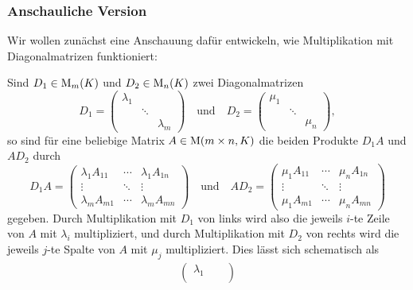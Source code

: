\subsubsection{Anschauliche Version}

Wir wollen zunächst eine Anschauung dafür entwickeln, wie Multiplikation mit Diagonalmatrizen funktioniert:

\begin{observation}
  \label{observation: multiplication with diagonal matrices}
  Sind $D_1 \in \operatorname{M}_{m}(K)$ und $D_2 \in \operatorname{M}_{n}(K)$ zwei Diagonalmatrizen
  \[
      D_1
    = \begin{pmatrix}
        \lambda_1 &         &           \\
                  & \ddots  &           \\
                  &         & \lambda_m 
      \end{pmatrix}
    \quad\text{und}\quad
      D_2
    = \begin{pmatrix}
        \mu_1 &         &       \\
              & \ddots  &       \\
              &         & \mu_n 
      \end{pmatrix},
  \]
  so sind für eine beliebige Matrix $A \in \operatorname{M}(m \times n, K)$ die beiden Produkte $D_1 A$ und $A D_2$ durch
  \[
      D_1 A
    = \begin{pmatrix}
        \lambda_1 A_{11}  & \cdots  & \lambda_1 A_{1n}  \\
        \vdots            & \ddots  & \vdots            \\
        \lambda_m A_{m1}  & \cdots  & \lambda_m A_{mn}
      \end{pmatrix}
    \quad\text{und}\quad
      A D_2
    = \begin{pmatrix}
        \mu_1 A_{11}  & \cdots  & \mu_n A_{1n}  \\
        \vdots        & \ddots  & \vdots        \\
        \mu_1 A_{m1}  & \cdots  & \mu_n A_{mn}
      \end{pmatrix}
  \]
  gegeben.
  Durch Multiplikation mit $D_1$ von links wird also die jeweils $i$-te Zeile von $A$ mit $\lambda_i$ multipliziert, und durch Multiplikation mit $D_2$ von rechts wird die jeweils $j$-te Spalte von $A$ mit $\mu_j$ multipliziert.
  Dies lässt sich schematisch als
  \begin{align*}
        \begin{pmatrix}
          \lambda_1 &         &           \\

\end{pmatrix}
\end{align*}
\end{observation}
